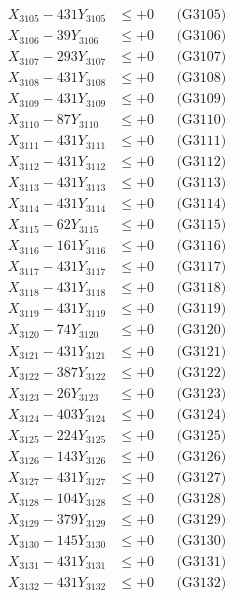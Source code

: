 \documentclass[a4paper,10pt]{article}
\begin{document}
{\begin{align}
X_{3105} - 431Y_{3105} &\leq +0 && \text{(G3105)} \\
X_{3106} - 39Y_{3106} &\leq +0 && \text{(G3106)} \\
X_{3107} - 293Y_{3107} &\leq +0 && \text{(G3107)} \\
X_{3108} - 431Y_{3108} &\leq +0 && \text{(G3108)} \\
X_{3109} - 431Y_{3109} &\leq +0 && \text{(G3109)} \\
X_{3110} - 87Y_{3110} &\leq +0 && \text{(G3110)} \\
\allowbreak
X_{3111} - 431Y_{3111} &\leq +0 && \text{(G3111)} \\
X_{3112} - 431Y_{3112} &\leq +0 && \text{(G3112)} \\
X_{3113} - 431Y_{3113} &\leq +0 && \text{(G3113)} \\
X_{3114} - 431Y_{3114} &\leq +0 && \text{(G3114)} \\
X_{3115} - 62Y_{3115} &\leq +0 && \text{(G3115)} \\
X_{3116} - 161Y_{3116} &\leq +0 && \text{(G3116)} \\
X_{3117} - 431Y_{3117} &\leq +0 && \text{(G3117)} \\
X_{3118} - 431Y_{3118} &\leq +0 && \text{(G3118)} \\
X_{3119} - 431Y_{3119} &\leq +0 && \text{(G3119)} \\
X_{3120} - 74Y_{3120} &\leq +0 && \text{(G3120)} \\
\allowbreak
X_{3121} - 431Y_{3121} &\leq +0 && \text{(G3121)} \\
X_{3122} - 387Y_{3122} &\leq +0 && \text{(G3122)} \\
X_{3123} - 26Y_{3123} &\leq +0 && \text{(G3123)} \\
X_{3124} - 403Y_{3124} &\leq +0 && \text{(G3124)} \\
X_{3125} - 224Y_{3125} &\leq +0 && \text{(G3125)} \\
X_{3126} - 143Y_{3126} &\leq +0 && \text{(G3126)} \\
X_{3127} - 431Y_{3127} &\leq +0 && \text{(G3127)} \\
X_{3128} - 104Y_{3128} &\leq +0 && \text{(G3128)} \\
X_{3129} - 379Y_{3129} &\leq +0 && \text{(G3129)} \\
X_{3130} - 145Y_{3130} &\leq +0 && \text{(G3130)} \\
\allowbreak
X_{3131} - 431Y_{3131} &\leq +0 && \text{(G3131)} \\
X_{3132} - 431Y_{3132} &\leq +0 && \text{(G3132)} \\

\end{align}}
\end{document}
